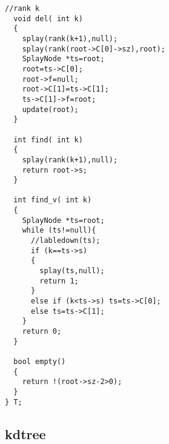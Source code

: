 \begin{lstlisting}[language={}]
  //rank k
  void del( int k)
  {
    splay(rank(k+1),null);
    splay(rank(root->C[0]->sz),root);
    SplayNode *ts=root;
    root=ts->C[0];
    root->f=null;
    root->C[1]=ts->C[1];
    ts->C[1]->f=root;
    update(root);
  }

  int find( int k)
  {
    splay(rank(k+1),null);
    return root->s;
  }
  
  int find_v( int k)
  {
    SplayNode *ts=root;
    while (ts!=null){
      //labledown(ts);
      if (k==ts->s)
      {
        splay(ts,null);
        return 1;
      }
      else if (k<ts->s) ts=ts->C[0];
      else ts=ts->C[1];
    }
    return 0;
  }

  bool empty()
  {
    return !(root->sz-2>0);
  }
} T;
\end{lstlisting}
\subsection{kdtree}
